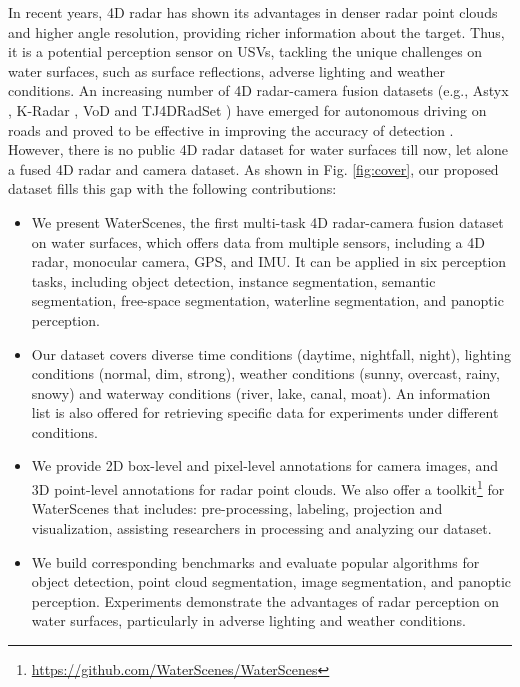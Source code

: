 \documentclass[lettersize,journal]{IEEEtran}
\begin{document}
In recent years, 4D radar has shown its advantages in denser radar point clouds and higher angle resolution, providing richer information about the target. Thus, it is a potential perception sensor on USVs, tackling the unique challenges on water surfaces, such as surface reflections, adverse lighting and weather conditions.
An increasing number of 4D radar-camera fusion datasets (e.g., Astyx \cite{meyer2019automotive}, K-Radar \cite{paek2022k}, VoD \cite{palffy2022multi} and TJ4DRadSet \cite{zheng2022tj4dradset}) have emerged for autonomous driving on roads and proved to be effective in improving the accuracy of detection \cite{zheng2023rcfusion, xiong2023lxl}. 
However, there is no public 4D radar dataset for water surfaces till now, let alone a fused 4D radar and camera dataset.
As shown in Fig. \ref{fig:cover}, our proposed dataset fills this gap with the following contributions:
















\begin{itemize}
\item We present WaterScenes, the first multi-task 4D radar-camera fusion dataset on water surfaces, which offers data from multiple sensors, including a 4D radar, monocular camera, GPS, and IMU. It can be applied in six perception tasks, including object detection, instance segmentation, semantic segmentation, free-space segmentation, waterline segmentation, and panoptic perception.
\item Our dataset covers diverse time conditions (daytime, nightfall, night), lighting conditions (normal, dim, strong), weather conditions (sunny, overcast, rainy, snowy) and waterway conditions (river, lake, canal, moat). An information list is also offered for retrieving specific data for experiments under different conditions.
\item We provide 2D box-level and pixel-level annotations for camera images, and 3D point-level annotations for radar point clouds. We also offer a toolkit\footnote{\url{https://github.com/WaterScenes/WaterScenes}} for WaterScenes that includes: pre-processing, labeling, projection and visualization, assisting researchers in processing and analyzing our dataset.
\item We build corresponding benchmarks and evaluate popular algorithms for object detection, point cloud segmentation, image segmentation, and panoptic perception. Experiments demonstrate the advantages of radar perception on water surfaces, particularly in adverse lighting and weather conditions.
\end{itemize}
\end{document}
